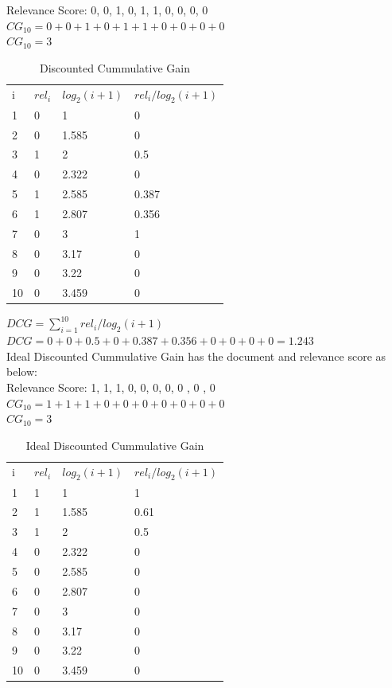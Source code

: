 \documentclass[12pt]{report}
\begin{document}
Relevance Score: 0, 0, 1, 0, 1, 1, 0, 0, 0, 0\\
$CG_{10} = 0+ 0+ 1+ 0+ 1 + 1 + 0 + 0 + 0 + 0$\\
$CG_{10}= 3$ \\
\begin{table}[]
\centering
\caption{Discounted Cummulative Gain}
\label{my-label}
\begin{tabular}{llll}
i & $rel_i$ & $log_2(i + 1)$   & $rel_i / log_2(i + 1)$  \\
1 & 0        & 1     		    & 0    \\
2 & 0        & 1.585 		    & 0 \\
3 & 1        & 2     		    & 0.5  \\
4 & 0        & 2.322 		    & 0 \\
5 & 1        & 2.585 		    & 0.387 \\ 
6 & 1        & 2.807     	    & 0.356    \\
7 & 0        & 3 		    & 1 \\
8 & 0        & 3.17    		    & 0  \\
9 & 0        & 3.22 		    & 0 \\
10 & 0      & 3.459 		    & 0 \\ 
\end{tabular}
\end{table}
$DCG = \sum\limits_{i=1}^{10} rel_i / log_2(i + 1)$ \\
$DCG = 0 + 0 + 0.5 + 0 + 0.387 + 0.356 + 0 + 0 + 0 + 0 =  1.243$\\
Ideal Discounted Cummulative Gain has the document and relevance score as below:\\
Relevance Score: 1, 1, 1, 0, 0, 0, 0, 0 , 0 , 0 \\
$CG_{10} = 1+ 1 + 1+ 0+ 0+ 0+ 0 + 0 + 0 + 0$\\
$CG_{10} = 3$ \\
\begin{table}[]
\centering
\caption{Ideal Discounted Cummulative Gain}
\label{my-label}
\begin{tabular}{llll}
i & $rel_i$ & $log_2(i + 1)$   & $rel_i / log_2(i + 1)$  \\
1 & 1        & 1     		    & 1    \\
2 & 1        & 1.585 		    & 0.61 \\
3 & 1        & 2     		    & 0.5  \\
4 & 0        & 2.322 		    & 0 \\
5 & 0        & 2.585 		    & 0 \\ 
6 & 0        & 2.807     	    & 0   \\
7 & 0        & 3 		    & 0 \\
8 & 0        & 3.17    		    & 0  \\
9 & 0        & 3.22 		    & 0 \\
10 & 0      & 3.459 		    & 0 \\ 
\end{tabular}
\end{table}
\end{document}
